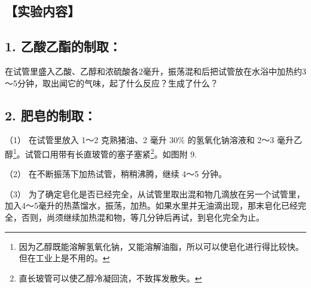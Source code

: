 {\centering
\small\setlength{\tabcolsep}{3pt}%
\par
}

\subsection{【实验内容】}

\subsection{1. 乙酸乙酯的制取：}

在试管里盛入乙酸、乙醇和浓硫酸各2毫升，振荡混和后把试管放在水浴中加热约3～5分钟，取出闻它的气味，起了什么反应？生成了什么？

\subsection{2. 肥皂的制取：}

（1） 在试管里放入 1～2 克熟猪油、2 毫升 30\% 的氢氧化钠溶液和 2～3
毫升乙醇\footnote{因为乙醇既能溶解氢氧化钠，又能溶解油脂，所以可以使皂化进行得比较快。但在工业上是不用的。}。试管口用带有长直玻管的塞子塞紧\footnote{直长玻管可以使乙醇冷凝回流，不致挥发散失。}。如图附
9.

（2） 在不断振荡下加热试管，稍稍沸腾，继续 4～5 分钟。

（3）
为了确定皂化是否已经完全，从试管里取出混和物几滴放在另一个试管里，加入4～5毫升的热蒸馏水，振荡，加热。如果水里并无油滴出现，那末皂化已经完全，否则，尚须继续加热混和物，等几分钟后再试，到皂化完全为止。

